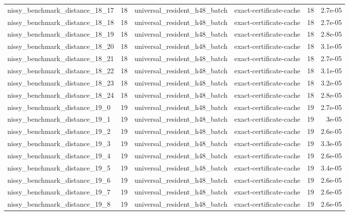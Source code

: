 {\begin{tabular}{lrllrr}
nissy\_benchmark\_distance\_18\_17 & 18 & universal\_resident\_h48\_batch & exact-certificate-cache & 18 & 2.7e-05 \\
nissy\_benchmark\_distance\_18\_18 & 18 & universal\_resident\_h48\_batch & exact-certificate-cache & 18 & 2.7e-05 \\
nissy\_benchmark\_distance\_18\_19 & 18 & universal\_resident\_h48\_batch & exact-certificate-cache & 18 & 2.8e-05 \\
nissy\_benchmark\_distance\_18\_20 & 18 & universal\_resident\_h48\_batch & exact-certificate-cache & 18 & 3.1e-05 \\
nissy\_benchmark\_distance\_18\_21 & 18 & universal\_resident\_h48\_batch & exact-certificate-cache & 18 & 2.7e-05 \\
nissy\_benchmark\_distance\_18\_22 & 18 & universal\_resident\_h48\_batch & exact-certificate-cache & 18 & 3.1e-05 \\
nissy\_benchmark\_distance\_18\_23 & 18 & universal\_resident\_h48\_batch & exact-certificate-cache & 18 & 3.2e-05 \\
nissy\_benchmark\_distance\_18\_24 & 18 & universal\_resident\_h48\_batch & exact-certificate-cache & 18 & 2.8e-05 \\
nissy\_benchmark\_distance\_19\_0 & 19 & universal\_resident\_h48\_batch & exact-certificate-cache & 19 & 2.7e-05 \\
nissy\_benchmark\_distance\_19\_1 & 19 & universal\_resident\_h48\_batch & exact-certificate-cache & 19 & 3e-05 \\
nissy\_benchmark\_distance\_19\_2 & 19 & universal\_resident\_h48\_batch & exact-certificate-cache & 19 & 2.6e-05 \\
nissy\_benchmark\_distance\_19\_3 & 19 & universal\_resident\_h48\_batch & exact-certificate-cache & 19 & 3.3e-05 \\
nissy\_benchmark\_distance\_19\_4 & 19 & universal\_resident\_h48\_batch & exact-certificate-cache & 19 & 2.6e-05 \\
nissy\_benchmark\_distance\_19\_5 & 19 & universal\_resident\_h48\_batch & exact-certificate-cache & 19 & 3.4e-05 \\
nissy\_benchmark\_distance\_19\_6 & 19 & universal\_resident\_h48\_batch & exact-certificate-cache & 19 & 2.6e-05 \\
nissy\_benchmark\_distance\_19\_7 & 19 & universal\_resident\_h48\_batch & exact-certificate-cache & 19 & 2.6e-05 \\
nissy\_benchmark\_distance\_19\_8 & 19 & universal\_resident\_h48\_batch & exact-certificate-cache & 19 & 2.6e-05 \\

\end{tabular}}
